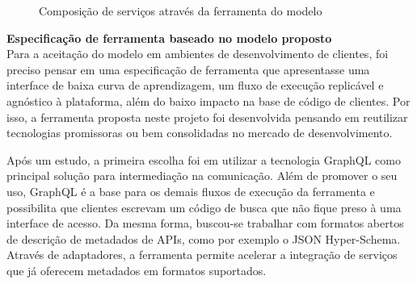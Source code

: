 \begin{figure}[H]
  \centering
  \caption{Composição de serviços através da ferramenta do modelo}
\end{figure}

\textbf{Especificação de ferramenta baseado no modelo proposto} \\

Para a aceitação do modelo em ambientes de desenvolvimento de clientes, foi preciso pensar em uma especificação de ferramenta que apresentasse uma interface de baixa curva de aprendizagem, um fluxo de execução replicável e agnóstico à plataforma, além do baixo impacto na base de código de clientes. Por isso, a ferramenta proposta neste projeto foi desenvolvida pensando em reutilizar tecnologias promissoras ou bem consolidadas no mercado de desenvolvimento.

Após um estudo, a primeira escolha foi em utilizar a tecnologia GraphQL como principal solução para intermediação na comunicação. Além de promover o seu uso, GraphQL é a base para os demais fluxos de execução da ferramenta e possibilita que clientes escrevam um código de busca que não fique preso à uma interface de acesso. Da mesma forma, buscou-se trabalhar com formatos abertos de descrição de metadados de APIs, como por exemplo o JSON Hyper-Schema. Através de adaptadores, a ferramenta permite acelerar a integração de serviços que já oferecem metadados em formatos suportados.

